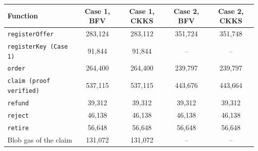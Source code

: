 \begin{tabular}{lcccc}
\toprule
Function & Case 1, BFV & Case 1, CKKS & Case 2, BFV & Case 2, CKKS \\
\midrule
\texttt{registerOffer} & 283{,}124 & 283{,}112 & 351{,}724 & 351{,}748 \\
\texttt{registerKey (Case 1)} & 91{,}844 & 91{,}844 & -- & -- \\
\texttt{order} & 264{,}400 & 264{,}400 & 239{,}797 & 239{,}797 \\
\texttt{claim (proof verified)} & 537{,}115 & 537{,}115 & 443{,}676 & 443{,}664 \\
\texttt{refund} & 39{,}312 & 39{,}312 & 39{,}312 & 39{,}312 \\
\texttt{reject} & 46{,}138 & 46{,}138 & 46{,}138 & 46{,}138 \\
\texttt{retire} & 56{,}648 & 56{,}648 & 56{,}648 & 56{,}648 \\
Blob gas of the claim & 131{,}072 & 131{,}072 & -- & -- \\
\bottomrule
\end{tabular}
